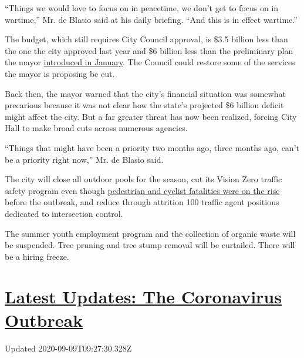 ``Things we would love to focus on in peacetime, we don't get to focus
on in wartime,'' Mr. de Blasio said at his daily briefing. ``And this is
in effect wartime.''

The budget, which still requires City Council approval, is \$3.5 billion
less than the one the city approved last year and \$6 billion less than
the preliminary plan the mayor
\href{https://www.nytimes3xbfgragh.onion/2020/01/16/nyregion/budget-new-york-city.html}{introduced
in January}. The Council could restore some of the services the mayor is
proposing be cut.

Back then, the mayor warned that the city's financial situation was
somewhat precarious because it was not clear how the state's projected
\$6 billion deficit might affect the city. But a far greater threat has
now been realized, forcing City Hall to make broad cuts across numerous
agencies.

``Things that might have been a priority two months ago, three months
ago, can't be a priority right now,'' Mr. de Blasio said.

The city will close all outdoor pools for the season, cut its Vision
Zero traffic safety program even though
\href{https://www.nytimes3xbfgragh.onion/2020/01/01/nyregion/nyc-biking-deaths.html}{pedestrian
and cyclist fatalities were on the rise} before the outbreak, and reduce
through attrition 100 traffic agent positions dedicated to intersection
control.

The summer youth employment program and the collection of organic waste
will be suspended. Tree pruning and tree stump removal will be
curtailed. There will be a hiring freeze.

\hypertarget{latest-updates-the-coronavirus-outbreak}{%
\section{\texorpdfstring{\href{https://www.nytimes3xbfgragh.onion/2020/09/08/world/covid-19-coronavirus.html?action=click\&pgtype=Article\&state=default\&region=MAIN_CONTENT_1\&context=storylines_live_updates}{Latest
Updates: The Coronavirus
Outbreak}}{Latest Updates: The Coronavirus Outbreak}}\label{latest-updates-the-coronavirus-outbreak}}

Updated 2020-09-09T09:27:30.328Z

